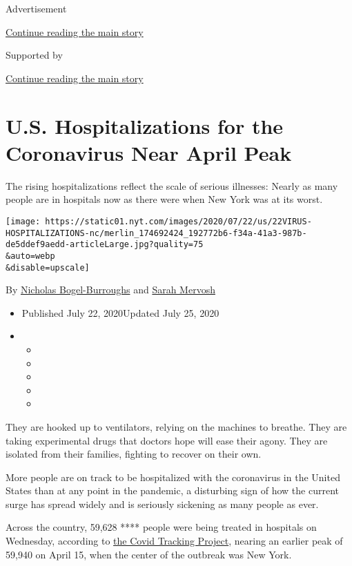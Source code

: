 Advertisement

\protect\hyperlink{after-top}{Continue reading the main story}

Supported by

\protect\hyperlink{after-sponsor}{Continue reading the main story}

\hypertarget{us-hospitalizations-for-the-coronavirus-near-april-peak}{%
\section{U.S. Hospitalizations for the Coronavirus Near April
Peak}\label{us-hospitalizations-for-the-coronavirus-near-april-peak}}

The rising hospitalizations reflect the scale of serious illnesses:
Nearly as many people are in hospitals now as there were when New York
was at its worst.

\texttt{[image: https://static01.nyt.com/images/2020/07/22/us/22VIRUS-HOSPITALIZATIONS-nc/merlin\_174692424\_192772b6-f34a-41a3-987b-de5ddef9aedd-articleLarge.jpg?quality=75\\\&auto=webp\\\&disable=upscale]}

By \href{https://www.nytimes.com/by/nicholas-bogel-burroughs}{Nicholas
Bogel-Burroughs} and
\href{https://www.nytimes.com/by/sarah-mervosh}{Sarah Mervosh}

\begin{itemize}
\item
  Published July 22, 2020Updated July 25, 2020
\item
  \begin{itemize}
  \item
  \item
  \item
  \item
  \item
  \end{itemize}
\end{itemize}

They are hooked up to ventilators, relying on the machines to breathe.
They are taking experimental drugs that doctors hope will ease their
agony. They are isolated from their families, fighting to recover on
their own.

More people are on track to be hospitalized with the coronavirus in the
United States than at any point in the pandemic, a disturbing sign of
how the current surge has spread widely and is seriously sickening as
many people as ever.

Across the country, 59,628 **** people were being treated in hospitals
on Wednesday, according to
\href{https://covidtracking.com/data/us-daily}{the Covid Tracking
Project}, nearing an earlier peak of 59,940 on April 15, when the center
of the outbreak was New York.

